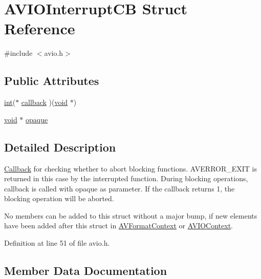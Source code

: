 \hypertarget{struct_a_v_i_o_interrupt_c_b}{}\section{A\+V\+I\+O\+Interrupt\+CB Struct Reference}
\label{struct_a_v_i_o_interrupt_c_b}


{\ttfamily \#include $<$avio.\+h$>$}

\subsection*{Public Attributes}
\begin{DoxyCompactItemize}
\item 
\hyperlink{xmltok_8h_a5a0d4a5641ce434f1d23533f2b2e6653}{int}($\ast$ \hyperlink{struct_a_v_i_o_interrupt_c_b_ac5de25559a8b29f3e55a3e956115e54a}{callback} )(\hyperlink{sound_8c_ae35f5844602719cf66324f4de2a658b3}{void} $\ast$)
\item 
\hyperlink{sound_8c_ae35f5844602719cf66324f4de2a658b3}{void} $\ast$ \hyperlink{struct_a_v_i_o_interrupt_c_b_a873ae56fef71d27dca1088dfd55c2197}{opaque}
\end{DoxyCompactItemize}


\subsection{Detailed Description}
\hyperlink{class_callback}{Callback} for checking whether to abort blocking functions. A\+V\+E\+R\+R\+O\+R\+\_\+\+E\+X\+IT is returned in this case by the interrupted function. During blocking operations, callback is called with opaque as parameter. If the callback returns 1, the blocking operation will be aborted.

No members can be added to this struct without a major bump, if new elements have been added after this struct in \hyperlink{struct_a_v_format_context}{A\+V\+Format\+Context} or \hyperlink{struct_a_v_i_o_context}{A\+V\+I\+O\+Context}. 

Definition at line 51 of file avio.\+h.



\subsection{Member Data Documentation}
